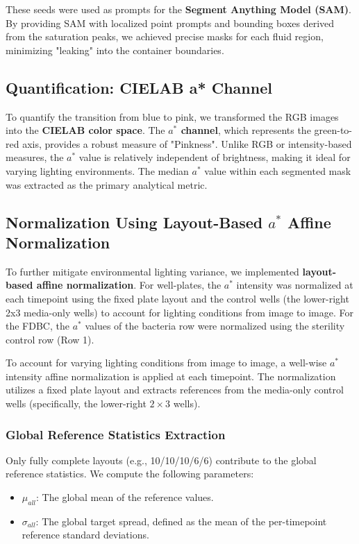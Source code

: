\documentclass[conference]{IEEEtran}
\begin{document}
These seeds were used as prompts for the \textbf{Segment Anything Model (SAM)}. By providing SAM with localized point prompts and bounding boxes derived from the saturation peaks, we achieved precise masks for each fluid region, minimizing "leaking" into the container boundaries.

\subsection{Quantification: CIELAB a* Channel}
To quantify the transition from blue to pink, we transformed the RGB images into the \textbf{CIELAB color space}. The \textbf{$a^*$ channel}, which represents the green-to-red axis, provides a robust measure of "Pinkness". Unlike RGB or intensity-based measures, the $a^*$ value is relatively independent of brightness, making it ideal for varying lighting environments. The median $a^*$ value within each segmented mask was extracted as the primary analytical metric.

\subsection{Normalization Using Layout-Based $a^*$ Affine Normalization}
To further mitigate environmental lighting variance, we implemented \textbf{layout-based affine normalization}. For well-plates, the $a^*$ intensity was normalized at each timepoint using the fixed plate layout and the control wells (the lower-right 2x3 media-only wells) to account for lighting conditions from image to image. For the FDBC, the $a^*$ values of the bacteria row were normalized using the sterility control row (Row 1).

To account for varying lighting conditions from image to image, a well-wise $a^*$ intensity affine normalization is applied at each timepoint. The normalization utilizes a fixed plate layout and extracts references from the media-only control wells (specifically, the lower-right $2 \times 3$ wells).

\subsubsection{Global Reference Statistics Extraction}
Only fully complete layouts (e.g., 10/10/10/6/6) contribute to the global reference statistics. We compute the following parameters:
\begin{itemize}
    \item $\mu_{all}$: The global mean of the reference values.
    \item $\sigma_{all}$: The global target spread, defined as the mean of the per-timepoint reference standard deviations.
\end{itemize}
\end{document}
